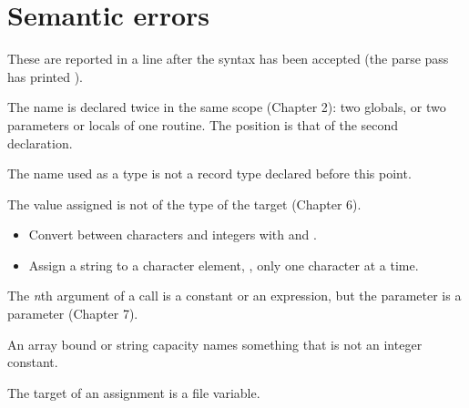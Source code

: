 \section{Semantic errors}
These are reported in a  line after the syntax has been
accepted (the parse pass has printed ).

The name is declared twice in the same scope (Chapter 2): two globals, or
two parameters or locals of one routine.  The position is that of the
second declaration.



The name used as a type is not a record type declared before this point.

The value assigned is not of the type of the target (Chapter 6).
\begin{itemize}
\item Convert between characters and integers with  and
  .
\item Assign a string to a character element, , only one
  character at a time.
\end{itemize}



The \textit{n}th argument of a call is a constant or an expression, but the
parameter is a  parameter (Chapter 7).

An array bound or string capacity names something that is not an integer
constant.

The target of an assignment is a file variable.

